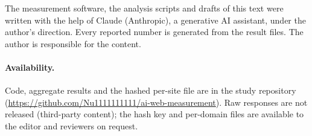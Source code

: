 \documentclass[sigconf,nonacm]{acmart}
\begin{document}
\begin{acks}
The measurement software, the analysis scripts and drafts of this text were written with the
help of Claude (Anthropic), a generative AI assistant, under the author's direction. Every
reported number is generated from the result files. The author is responsible for the content.
\end{acks}

\paragraph{Availability.} Code, aggregate results and the hashed per-site file are in the study
repository (\url{https://github.com/Nu1111111111/ai-web-measurement}). Raw responses are not released (third-party content); the
hash key and per-domain files are available to the editor and reviewers on request.

\balance


\end{document}
